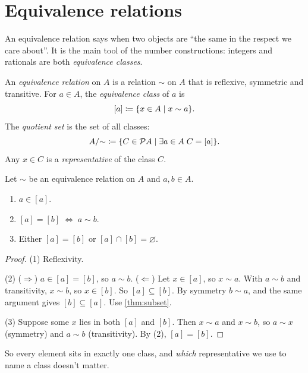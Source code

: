 \section{Equivalence relations}

An equivalence relation says when two objects are \enquote{the same in the respect
we care about}. It is the main tool of the number constructions: integers and
rationals are both \emph{equivalence classes}.

\begin{definition}
\label{def:equivalence}
An \emph{equivalence relation} on $A$ is a relation $\sim$ on $A$ that is
reflexive, symmetric and transitive. For $a \in A$, the \emph{equivalence class}
of $a$ is
\[
  [a] \coloneqq \lbrace x \in A \mid x \sim a \rbrace.
\]
The \emph{quotient set} is the set of all classes:
\[
  A/{\sim} \coloneqq \lbrace C \in \mathcal{P} A \mid \exists a \in A\; C = [a] \rbrace.
\]
Any $x \in C$ is a \emph{representative} of the class $C$.
\end{definition}

\begin{lemma}
\label{lem:classes}
Let $\sim$ be an equivalence relation on $A$ and $a, b \in A$.
\begin{enumerate}
  \item $a \in [a]$.
  \item $[a] = [b] \;\Leftrightarrow\; a \sim b$.
  \item Either $[a] = [b]$ or $[a] \cap [b] = \varnothing$.
\end{enumerate}
\end{lemma}

\begin{proof}
(1) Reflexivity.

(2) ($\Rightarrow$) $a \in [a] = [b]$, so $a \sim b$. ($\Leftarrow$) Let $x \in
[a]$, so $x \sim a$. With $a \sim b$ and transitivity, $x \sim b$, so $x \in [b]$.
So $[a] \subseteq [b]$. By symmetry $b \sim a$, and the same argument gives $[b]
\subseteq [a]$. Use \cref{thm:subset}.

(3) Suppose some $x$ lies in both $[a]$ and $[b]$. Then $x \sim a$ and $x \sim b$,
so $a \sim x$ (symmetry) and $a \sim b$ (transitivity). By (2), $[a] = [b]$.
\end{proof}

So every element sits in exactly one class, and \emph{which} representative we
use to name a class doesn't matter.

